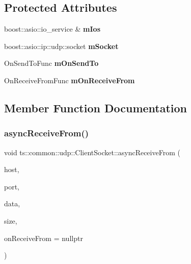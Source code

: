 \subsection*{Protected Attributes}
\begin{DoxyCompactItemize}
\item 
\mbox{\label{classts_1_1common_1_1udp_1_1_client_socket_a60a04fec1d4d4f1be81bfb0a62539c07}} 
boost\+::asio\+::io\+\_\+service \& {\bfseries m\+Ios}
\item 
\mbox{\label{classts_1_1common_1_1udp_1_1_client_socket_a7216f8d5c2346cb22cceb64371fe26f3}} 
boost\+::asio\+::ip\+::udp\+::socket {\bfseries m\+Socket}
\item 
\mbox{\label{classts_1_1common_1_1udp_1_1_client_socket_aad7a08fec800008fd1e6602943ddfc8c}} 
On\+Send\+To\+Func {\bfseries m\+On\+Send\+To}
\item 
\mbox{\label{classts_1_1common_1_1udp_1_1_client_socket_add732d15aa6129e1960e4e5addbe03a3}} 
On\+Receive\+From\+Func {\bfseries m\+On\+Receive\+From}
\end{DoxyCompactItemize}


\subsection{Member Function Documentation}
\mbox{\label{classts_1_1common_1_1udp_1_1_client_socket_ae2789434073141d578f5fd740eb42068}} 
\subsubsection{\texorpdfstring{async\+Receive\+From()}{asyncReceiveFrom()}}
{\footnotesize\ttfamily void ts\+::common\+::udp\+::\+Client\+Socket\+::async\+Receive\+From (\begin{DoxyParamCaption}\item[{const std\+::string \&}]{host,  }\item[{unsigned short}]{port,  }\item[{void $\ast$}]{data,  }\item[{size\+\_\+t}]{size,  }\item[{On\+Receive\+From\+Func}]{on\+Receive\+From = {\ttfamily nullptr} }\end{DoxyParamCaption})}


